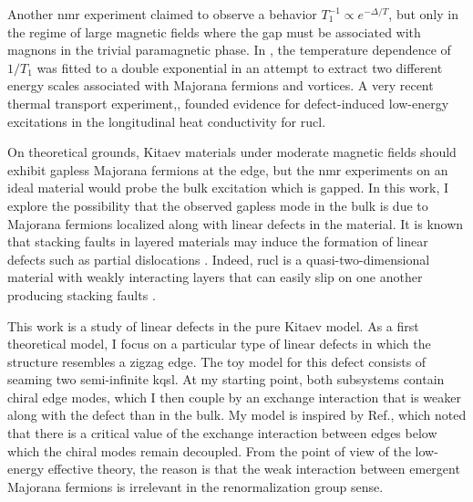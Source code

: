 Another \acrshort{nmr} experiment \cite{ Baek2017} claimed to observe a behavior $T_1^{-1} \propto e^{-\Delta/T}$, but only in the regime of large magnetic fields where the gap must be associated with magnons in the trivial paramagnetic phase. In \cite{Nagai_2020}, the temperature dependence of $1/T_1$ was fitted to a double exponential in an attempt to extract two different energy scales associated with Majorana fermions and vortices.
A very recent thermal transport experiment,\cite{Hentrich_2020}, founded evidence for defect-induced low-energy excitations in the longitudinal heat conductivity for \acrshort{rucl}.

On theoretical grounds, Kitaev materials under moderate magnetic fields should exhibit gapless Majorana fermions at the edge, but the \acrshort{nmr} experiments on an ideal material would probe the bulk excitation which is gapped. In this work, I explore the possibility that the observed gapless mode in the bulk is due to Majorana fermions localized along with linear defects in the material.%
It is known that stacking faults in layered materials may induce the formation of linear defects such as partial dislocations \cite{solyom-solids}.
Indeed, \acrshort{rucl} is a quasi-two-dimensional material with weakly interacting layers that can easily slip on one another producing stacking faults \cite{Kim_Kee_2016,Cao_2016,Ran2017,Zheng-SM2017}.

This work is a study of linear defects in the pure Kitaev model. As a first theoretical model, I focus on a particular type of linear defects in which the structure resembles a zigzag edge. The toy model for this defect consists of seaming two semi-infinite \acrshort{kqsl}. At my starting point, both subsystems contain chiral edge modes, which I then couple by an exchange interaction that is weaker along with the defect than in the bulk. My model is inspired by Ref.\cite{Aasen_2020}, which noted that there is a critical value of the exchange interaction between edges below which the chiral modes remain decoupled. From the point of view of the  low-energy  effective theory, the reason is that the weak interaction between emergent Majorana fermions is irrelevant in the renormalization group sense. %

